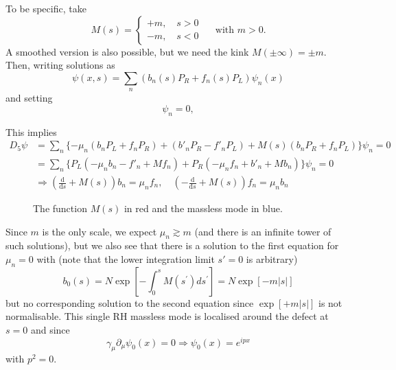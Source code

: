 To be specific, take
\begin{equation}
    M(s) = \begin{cases}
        +m, \quad s > 0 \\
        -m, \quad s<0
    \end{cases} \quad\text{ with }m>0.
\end{equation}
A smoothed version is also possible, but we need the kink $M(\pm \infty) = \pm m$. Then, writing solutions as
\begin{equation}
\psi(x,s) = \sum_n(b_n(s)P_R + f_n(s)P_L) \psi_n(x)
\end{equation}
and setting
\begin{equation}
    [\gamma_\mu \partial_\mu + \mu_n]\psi_n = 0,
\end{equation}

This implies
\begin{align}
    D_5 \psi &= \sum_n\{ -\mu_n(b_n P_L + f_n P_R) + (b'_nP_R - f'_nP_L) + M(s)(b_n P_R + f_n P_L)\} \psi_n = 0 \nonumber \\
    &= \sum_n \{ P_L(-\mu_n b_n - f'_n + M f_n) + P_R(-\mu_n f_n + b'_n + Mb_n)\} \psi_n = 0 \nonumber \\
    &\Rightarrow \left(\frac{\text{d}}{\text{d}s} + M(s)\right)b_n = \mu_n f_n, \quad \left(-\frac{\text{d}}{\text{d}s} + M(s)\right)f_n = \mu_n b_n
\end{align}

\begin{figure}
\caption{The function $M(s)$ in red and the massless mode in blue.}
\end{figure}

Since $m$ is the only scale, we expect $\mu_n \gtrsim m$ (and there is an infinite tower of such solutions), but we also see that there is a solution to the first equation for $\mu_n = 0$ with (note that the lower integration limit $s' = 0$ is arbitrary)
\begin{equation}
b_{0}(s)=N \exp \left[-\int_{0}^{s} M\left(s^{\prime}\right) d s^{\prime}\right]=N \exp [-m|s|]
\end{equation}
but no corresponding solution to the second equation since $\exp[+m|s|]$ is not normalisable. This single RH massless mode is localised around the defect at $s=0$ and since
\begin{equation}
    \gamma_\mu \partial_\mu \psi_0(x) = 0 \Rightarrow \psi_0(x) = e^{ipx}
\end{equation}
with $p^2 = 0$.

